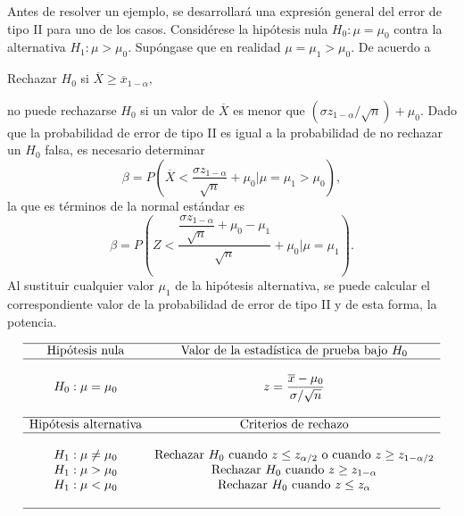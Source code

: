 Antes de resolver un ejemplo, se desarrollará una expresión general del error de tipo II para uno de los casos. Considérese la hipótesis nula $H_0:\mu=\mu_0$ contra la alternativa $H_1:\mu>\mu_0$. Supóngase que en realidad $\mu=\mu_1>\mu_0$. De acuerdo a 
\begin{center}
    Rechazar $H_0$ si $\overline{X}\geq \overline{x}_{1-\alpha},$
\end{center}
no puede rechazarse $H_0$ si un valor de $\overline{X}$ es menor que $(\sigma z_{1-\alpha}/\sqrt{n})+\mu_0$. Dado que la probabilidad de error de tipo II es igual a la probabilidad de no rechazar un $H_0$ falsa, es necesario determinar
$$\beta = P\left(\overline{X}<\dfrac{\sigma z_{1-\alpha}}{\sqrt{n}}+\mu_0 \bigg| \mu=\mu_1>\mu_0\right),$$
la que es términos de la normal estándar es
$$\beta = P\left(Z<\dfrac{\dfrac{\sigma z_{1-\alpha}}{\sqrt{n}}+\mu_0-\mu_1}{\sqrt{n}}+\mu_0 \Bigg| \mu=\mu_1\right).$$
Al sustituir cualquier valor $\mu_1$ de la hipótesis alternativa, se puede calcular el correspondiente valor de la probabilidad de error de tipo II y de esta forma, la potencia.

$$
\begin{array}{cc}
    \hline
    \mbox{Hipótesis nula} & \mbox{Valor de la estadística de prueba bajo } H_0\\
    \hline\\
    H_0: \mu=\mu_0 & z=\dfrac{\overline{x}-\mu_0}{\sigma/\sqrt{n}}\\\\
    \hline
    \mbox{Hipótesis alternativa} & \mbox{Criterios de rechazo}\\
    \hline\\
    H_1:\mu\neq \mu_0 & \mbox{Rechazar } H_0 \mbox{ cuando } z\leq z_{\alpha/2} \mbox{ o cuando } z\geq z_{1-\alpha/2}\\
    H_1:\mu> \mu_0 & \mbox{Rechazar } H_0 \mbox{ cuando } z\geq z_{1-\alpha}\\
    H_1:\mu< \mu_0 & \mbox{Rechazar } H_0 \mbox{ cuando } z\leq z_{\alpha}\\\\
    \hline
\end{array}

$$
